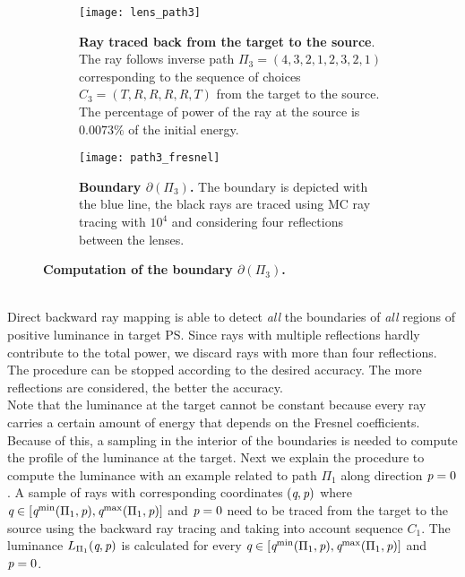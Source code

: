 \begin{figure}[t]
\centering
\begin{subfigure}[t]{.45\textwidth}
  \texttt{[image: lens\_path3]}
 \caption{\textbf{Ray traced back from the target to the source}. The ray follows inverse path $\Pi_3 = (4,3,2,1,2,3,2,1)$ corresponding to the sequence of choices $C_3=(T,R,R,R,R,T)$ from the target to the source. The percentage of power of the ray at the source is $0.0073\%$ of the initial energy.}
  \label{fig:ray_path3}
\end{subfigure}%
\hfill
\begin{subfigure}[t]{.45\textwidth}
  \texttt{[image: path3\_fresnel]}
  \caption{\textbf{Boundary $\partial$$(\Pi_3)$.} The boundary is depicted with the blue line, the black rays are traced using MC ray tracing with $10^4$ and considering four reflections between the lenses.} %
  \label{fig:boundary_path3}
\end{subfigure} %
\caption{\textbf{Computation of the boundary $\partial$$(\Pi_3)$.}}
\end{figure}
\\ \indent 
Direct backward ray mapping is able to detect \textit{all} the boundaries of \textit{all} regions of positive luminance in target PS. Since rays with multiple reflections hardly contribute to the total power, we discard rays with more than four reflections. The procedure can be stopped according to the desired accuracy. The more reflections are considered, the better the accuracy. \\ \indent
Note that the luminance at the target cannot be constant because every ray carries a certain amount of energy that depends on the Fresnel coefficients. Because of this, a sampling in the interior of the boundaries is needed to compute the profile of the luminance at the target. 
Next we explain the procedure to compute the luminance with an example related to path $\Pi_1$ along direction $\textit{p}=0$. A sample of rays with corresponding coordinates $(\textit{q}, \textit{p})$ where $\textit{q}\in[\textit{q}^{\textrm{min}}(\Pi_1,\textit{p}), \textit{q}^{\textrm{max}}(\Pi_1,\textit{p})]$ and $\textit{p}=0$ need to be traced from the target to the source using the backward ray tracing and taking into account sequence $C_1$. The luminance $L_{\Pi_1}(\textit{q}, \textit{p})$ is calculated for every $\textit{q}\in[\textit{q}^{\textrm{min}}(\Pi_1,\textit{p}), \textit{q}^{\textrm{max}}(\Pi_1,\textit{p})]$ and $\textit{p}=0$. 
